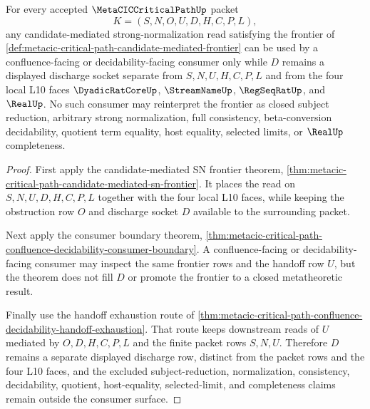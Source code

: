 \begin{theorem}
\label{thm:metacic-critical-path-candidate-mediated-sn-discharge-row}
For every accepted $\MetaCICCriticalPathUp$ packet
$$
K=(S,N,O,U,D,H,C,P,L),
$$
any candidate-mediated strong-normalization read satisfying the frontier of \autoref{def:metacic-critical-path-candidate-mediated-frontier} can be used by a confluence-facing or decidability-facing consumer only while $D$ remains a displayed discharge socket separate from $S,N,U,H,C,P,L$ and from the four local L10 faces $\DyadicRatCoreUp$, $\StreamNameUp$, $\RegSeqRatUp$, and $\RealUp$. No such consumer may reinterpret the frontier as closed subject reduction, arbitrary strong normalization, full consistency, beta-conversion decidability, quotient term equality, host equality, selected limits, or $\RealUp$ completeness.
\end{theorem}
\begin{proof}
First apply the candidate-mediated SN frontier theorem, \autoref{thm:metacic-critical-path-candidate-mediated-sn-frontier}. It places the read on $S,N,U,D,H,C,P,L$ together with the four local L10 faces, while keeping the obstruction row $O$ and discharge socket $D$ available to the surrounding packet.

Next apply the consumer boundary theorem, \autoref{thm:metacic-critical-path-confluence-decidability-consumer-boundary}. A confluence-facing or decidability-facing consumer may inspect the same frontier rows and the handoff row $U$, but the theorem does not fill $D$ or promote the frontier to a closed metatheoretic result.

Finally use the handoff exhaustion route of \autoref{thm:metacic-critical-path-confluence-decidability-handoff-exhaustion}. That route keeps downstream reads of $U$ mediated by $O,D,H,C,P,L$ and the finite packet rows $S,N,U$. Therefore $D$ remains a separate displayed discharge row, distinct from the packet rows and the four L10 faces, and the excluded subject-reduction, normalization, consistency, decidability, quotient, host-equality, selected-limit, and completeness claims remain outside the consumer surface.
\end{proof}

